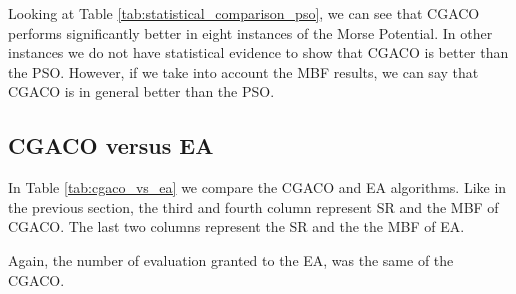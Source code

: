 		Looking at Table \ref{tab:statistical_comparison_pso}, we can see that CGACO performs significantly better in eight instances of the Morse Potential. In other instances we do not have statistical evidence to show that CGACO is better than the PSO. However, if we take into account the MBF results, we can say that CGACO is in general better than the PSO. 
		\pagebreak
		
		\subsection{CGACO versus EA}
		
			In Table \ref{tab:cgaco_vs_ea} we compare the CGACO and EA algorithms. Like in the previous section, the third and fourth column represent SR and the MBF of CGACO. The last two columns represent the SR and the the MBF of EA. 
			
			Again, the number of evaluation granted to the EA, was the same of the CGACO. 

